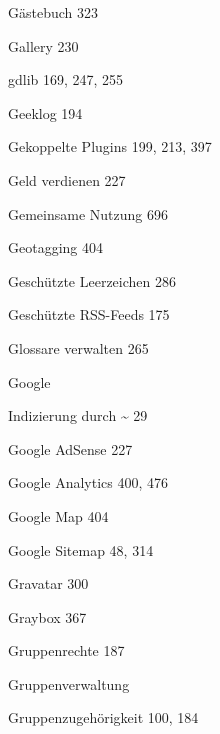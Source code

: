 \documentclass{book}
\renewcommand\subitem{\par}
\begin{document}
\begin{multicols}{2}
\begin{osp-index}
  \item G\"astebuch\hspace{1mm} 323
  \item Gallery\hspace{1mm} 230
  \item gdlib\hspace{1mm} 169, 247, 255
  \item Geeklog\hspace{1mm} 194
  \item Gekoppelte Plugins\hspace{1mm} 199, 213, 397
  \item Geld verdienen\hspace{1mm} 227
  \item Gemeinsame Nutzung\hspace{1mm} 696
  \item Geotagging\hspace{1mm} 404
  \item Gesch\"utzte Leerzeichen\hspace{1mm} 286
  \item Gesch\"utzte RSS-Feeds\hspace{1mm} 175
  \item Glossare verwalten\hspace{1mm} 265
  \item Google
    \subitem Indizierung durch \textasciitilde\hspace{1mm} 29
  \item Google AdSense\hspace{1mm} 227
  \item Google Analytics\hspace{1mm} 400, 476
  \item Google Map\hspace{1mm} 404
  \item Google Sitemap\hspace{1mm} 48, 314
  \item Gravatar\hspace{1mm} 300
  \item Graybox\hspace{1mm} 367
  \item Gruppenrechte\hspace{1mm} 187
  \item Gruppenverwaltung\hspace{1mm} 
  \item Gruppenzugeh\"origkeit\hspace{1mm} 100, 184


\end{osp-index}
\end{multicols}
\end{document}
